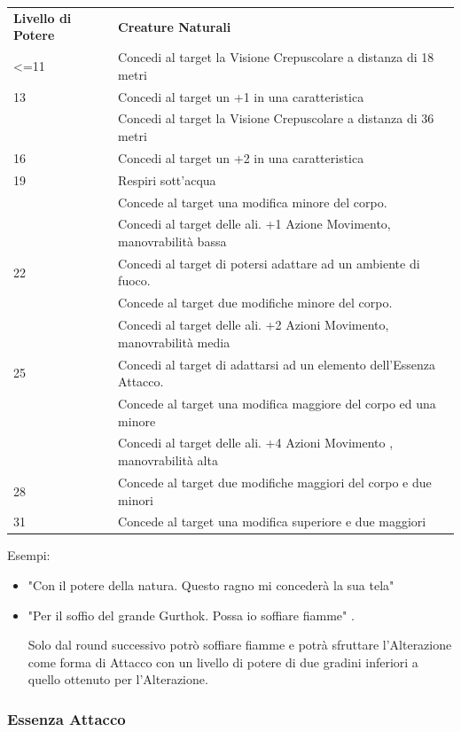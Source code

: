 \documentclass[a4paper,10 pt,twoside,openany]{book}
\begin{document}
\begin{tabularx}{0.95\textwidth}{lX}
	\toprule
	\textbf{Livello di Potere} & \textbf{Creature Naturali}\\
	<=11   & Concedi al target la Visione Crepuscolare a distanza di 18 metri\\
	13     & Concedi al target un +1 in una caratteristica\\
	& Concedi al target la Visione Crepuscolare a distanza di 36 metri\\
	16     & Concedi al target un +2 in una caratteristica\\
	19     & Respiri sott'acqua\\
	& Concede al target una modifica minore del corpo.\\
	& Concedi al target delle ali. +1 Azione Movimento, manovrabilità bassa\\
	22     & Concedi al target di potersi adattare ad un ambiente di fuoco.\\
	& Concede al target due modifiche minore del corpo.\\
	& Concedi al target delle ali. +2 Azioni Movimento, manovrabilità media\\
	25     & Concedi al target di adattarsi ad un elemento dell’Essenza Attacco. \\
	& Concede al target una modifica maggiore del corpo ed una minore\\
	& Concedi al target delle ali. +4 Azioni Movimento , manovrabilità alta\\
	28     & Concede al target due modifiche maggiori del corpo e due minori\\
	31     & Concede al target una modifica superiore e due maggiori\\
\end{tabularx}

\bigskip

Esempi:
\begin{itemize}
	\item
	"Con il potere della natura. Questo ragno mi concederà la sua tela"
	\item
	"Per il soffio del grande Gurthok. Possa io soffiare fiamme" .

	Solo dal round successivo potrò soffiare fiamme e potrà sfruttare l'Alterazione come forma di Attacco con un livello di potere di due gradini inferiori a quello ottenuto per l'Alterazione.
\end{itemize}

\pagebreak

\subsubsection{Essenza Attacco}
\end{document}
